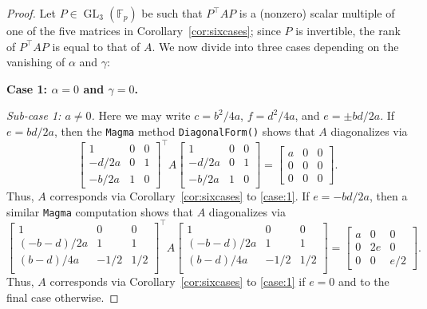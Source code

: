 \documentclass[10pt,a4paper]{amsart}
\numberwithin{equation}{section}
\numberwithin{figure}{section}
\numberwithin{table}{section}
\theoremstyle{definition}
\theoremstyle{plain}
\theoremstyle{remark}
\theoremstyle{plain}
\theoremstyle{definition}
\theoremstyle{plain}
\theoremstyle{plain}
\newcommand{\F}{\mathbb{F}}
\newcommand{\GL}{\operatorname{GL}}
\newcommand{\trsp}[1]{{{#1}^{\top}\!\!}}
\begin{document}
	\begin{proof}
		Let $P\in\GL_3(\F_p)$ be such that $\trsp{P}AP$ is a (nonzero) scalar multiple of one of the five matrices in Corollary~\ref{cor:sixcases}; since $P$ is invertible, the rank of $\trsp{P}AP$ is equal to that of $A$. We now divide into three cases depending on the vanishing of $\alpha$ and $\gamma$:

		\textbf{Case 1: $\alpha=0$ and $\gamma=0$.}
        
\emph{Sub-case 1: $a\ne 0$.} Here we may write $c=b^2/4a$, $f=d^2/4a$, and $e=\pm bd/2a$. If $e=bd/2a$, then the \texttt{Magma} method \texttt{DiagonalForm()} shows that $A$ diagonalizes via
\begin{equation*}
\begin{bmatrix}
1&0&0\\
-d/2a&0&1\\
-b/2a&1&0
\end{bmatrix}^\top\!
A
\begin{bmatrix}
1&0&0\\
-d/2a&0&1\\
-b/2a&1&0
\end{bmatrix}
=
\begin{bmatrix}
a&0&0\\
0&0&0\\
0&0&0
\end{bmatrix}.
\end{equation*}
Thus, $A$ corresponds via Corollary~\ref{cor:sixcases} to \eqref{case:1}. If $e=-bd/2a$, then a similar \texttt{Magma} computation shows that $A$ diagonalizes via
\begin{equation*}
\begin{bmatrix}
1&0&0\\
(-b-d)/2a&1&1\\
(b-d)/4a&-1/2&1/2\\
\end{bmatrix}^\top\!
A
\begin{bmatrix}
1&0&0\\
(-b-d)/2a&1&1\\
(b-d)/4a&-1/2&1/2\\
\end{bmatrix}
=
\begin{bmatrix}
a&0&0\\
0&2e&0\\
0&0&e/2
\end{bmatrix}.
\end{equation*}
Thus, $A$ corresponds via Corollary~\ref{cor:sixcases} to \eqref{case:1} if $e=0$ and to the final case otherwise.


\end{proof}
\end{document}
